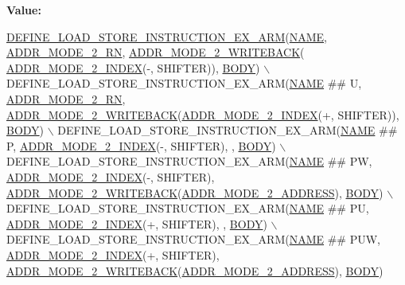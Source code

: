 {\bfseries Value\+:}
\begin{DoxyCode}
\mbox{\hyperlink{isa-arm_8c_af3fcd6969f12879634732491de99e437}{DEFINE\_LOAD\_STORE\_INSTRUCTION\_EX\_ARM}}(\mbox{\hyperlink{inflate_8h_a164ea0159d5f0b5f12a646f25f99eceaa67bc2ced260a8e43805d2480a785d312}{NAME}}, 
      \mbox{\hyperlink{isa-arm_8c_aa70b435f484716b425cd7376e52d9320}{ADDR\_MODE\_2\_RN}}, \mbox{\hyperlink{isa-arm_8c_a6cbeb951edc491533b2b648bb318961b}{ADDR\_MODE\_2\_WRITEBACK}}(
      \mbox{\hyperlink{isa-arm_8c_a2521ae1da803e2179985f57ede8ad83f}{ADDR\_MODE\_2\_INDEX}}(-, SHIFTER)), \mbox{\hyperlink{gzlog_8c_aa6bdf6a6d9916c343e1e17774d84a156}{BODY}}) \(\backslash\)
    DEFINE\_LOAD\_STORE\_INSTRUCTION\_EX\_ARM(\mbox{\hyperlink{inflate_8h_a164ea0159d5f0b5f12a646f25f99eceaa67bc2ced260a8e43805d2480a785d312}{NAME}} ## U, \mbox{\hyperlink{isa-arm_8c_aa70b435f484716b425cd7376e52d9320}{ADDR\_MODE\_2\_RN}}, 
      \mbox{\hyperlink{isa-arm_8c_a6cbeb951edc491533b2b648bb318961b}{ADDR\_MODE\_2\_WRITEBACK}}(\mbox{\hyperlink{isa-arm_8c_a2521ae1da803e2179985f57ede8ad83f}{ADDR\_MODE\_2\_INDEX}}(+, SHIFTER)), 
      \mbox{\hyperlink{gzlog_8c_aa6bdf6a6d9916c343e1e17774d84a156}{BODY}}) \(\backslash\)
    DEFINE\_LOAD\_STORE\_INSTRUCTION\_EX\_ARM(\mbox{\hyperlink{inflate_8h_a164ea0159d5f0b5f12a646f25f99eceaa67bc2ced260a8e43805d2480a785d312}{NAME}} ## P, \mbox{\hyperlink{isa-arm_8c_a2521ae1da803e2179985f57ede8ad83f}{ADDR\_MODE\_2\_INDEX}}(-, SHIFTER), , 
      \mbox{\hyperlink{gzlog_8c_aa6bdf6a6d9916c343e1e17774d84a156}{BODY}}) \(\backslash\)
    DEFINE\_LOAD\_STORE\_INSTRUCTION\_EX\_ARM(\mbox{\hyperlink{inflate_8h_a164ea0159d5f0b5f12a646f25f99eceaa67bc2ced260a8e43805d2480a785d312}{NAME}} ## PW, \mbox{\hyperlink{isa-arm_8c_a2521ae1da803e2179985f57ede8ad83f}{ADDR\_MODE\_2\_INDEX}}(-, SHIFTER), 
      \mbox{\hyperlink{isa-arm_8c_a6cbeb951edc491533b2b648bb318961b}{ADDR\_MODE\_2\_WRITEBACK}}(\mbox{\hyperlink{isa-arm_8c_a5d42149c9138a692e6243e1864c90d66}{ADDR\_MODE\_2\_ADDRESS}}), 
      \mbox{\hyperlink{gzlog_8c_aa6bdf6a6d9916c343e1e17774d84a156}{BODY}}) \(\backslash\)
    DEFINE\_LOAD\_STORE\_INSTRUCTION\_EX\_ARM(\mbox{\hyperlink{inflate_8h_a164ea0159d5f0b5f12a646f25f99eceaa67bc2ced260a8e43805d2480a785d312}{NAME}} ## PU, \mbox{\hyperlink{isa-arm_8c_a2521ae1da803e2179985f57ede8ad83f}{ADDR\_MODE\_2\_INDEX}}(+, SHIFTER), , 
      \mbox{\hyperlink{gzlog_8c_aa6bdf6a6d9916c343e1e17774d84a156}{BODY}}) \(\backslash\)
    DEFINE\_LOAD\_STORE\_INSTRUCTION\_EX\_ARM(\mbox{\hyperlink{inflate_8h_a164ea0159d5f0b5f12a646f25f99eceaa67bc2ced260a8e43805d2480a785d312}{NAME}} ## PUW, \mbox{\hyperlink{isa-arm_8c_a2521ae1da803e2179985f57ede8ad83f}{ADDR\_MODE\_2\_INDEX}}(+, SHIFTER), 
      \mbox{\hyperlink{isa-arm_8c_a6cbeb951edc491533b2b648bb318961b}{ADDR\_MODE\_2\_WRITEBACK}}(\mbox{\hyperlink{isa-arm_8c_a5d42149c9138a692e6243e1864c90d66}{ADDR\_MODE\_2\_ADDRESS}}), 
      \mbox{\hyperlink{gzlog_8c_aa6bdf6a6d9916c343e1e17774d84a156}{BODY}})
\end{DoxyCode}
